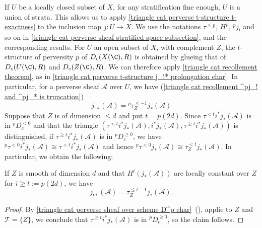 If $U$ be a locally closed subset of $X$, for any stratification fine enough, $U$ is a union of strata. This allows us to apply \cref{triangle cat perverse t-structure t-exactness} to the inclusion map $j:U\to X$. We use the notations $\tau^{\leq p}$, $H^p$, ${^pj_!}$ and so on in \autoref{triangle cat perverse sheaf stratified space subsection}, and the corresponding results. For $U$ an open subset of $X$, with complement $Z$, the $t$-structure of perversity $p$ of $D_c(X(\C),R)$ is obtained by glueing that of $D_c(U(\C),R)$ and $D_c(Z(\C),R)$. We can therefore apply \cref{triangle cat recollement theorem}, as in \cref{triangle cat perverse t-structure j_!* prolongation char}. In particular, for a perverse sheaf $\mathscr{A}$ over $U$, we have (\cref{triangle cat recollement ^pj_! and ^pj_* is truncation})
\begin{equation}\label{triangle cat perverse sheaf over scheme j_!*}
j_{!*}(\mathscr{A})={^p\tau_Z^{\leq -1}}j_*(\mathscr{A})
\end{equation}
Suppose that $Z$ is of dimension $\leq d$ and put $t=p(2d)$. Since $\tau^{<t}i^*j_*(\mathscr{A})$ is in ${^pD_c^{<0}}$ and that the triangle $(\tau^{<t}i^*j_*(\mathscr{A}),i^*j_*(\mathscr{A}),\tau^{\geq t}i^*j_*(\mathscr{A}))$ is distinguished, if $\tau^{\geq t}i^*j_*(\mathscr{A})$ is in ${^pD_c^{\geq 0}}$, we have ${^p\tau^{<0}}i^*j_*(\mathscr{A})\cong\tau^{<t}i^*j_*(\mathscr{A})$ and hence ${^p\tau^{<0}}j_*(\mathscr{A})\cong\tau_Z^{<t}j_*(\mathscr{A})$. In particular, we obtain the following:

\begin{proposition}\label{triangle cat perverse sheaf over scheme j_!* of j_*}
If $Z$ is smooth of dimension $d$ and that $H^i(j_*(\mathscr{A}))$ are locally constant over $Z$ for $i\geq t:=p(2d)$, we have
\begin{equation}\label{triangle cat perverse sheaf over scheme j_!* of j_*-1}
j_{!*}(\mathscr{A})=\tau_Z^{\leq t-1}j_*(\mathscr{A}).
\end{equation}
\end{proposition}
\begin{proof}
By \cref{triangle cat perverse sheaf over scheme D^p char}~(), applie to $Z$ and $\mathcal{T}=\{Z\}$, we conclude that $\tau^{\geq t}i^*j_*(\mathscr{A})$ is in ${^pD_c^{\geq 0}}$, so the claim follows.
\end{proof}

